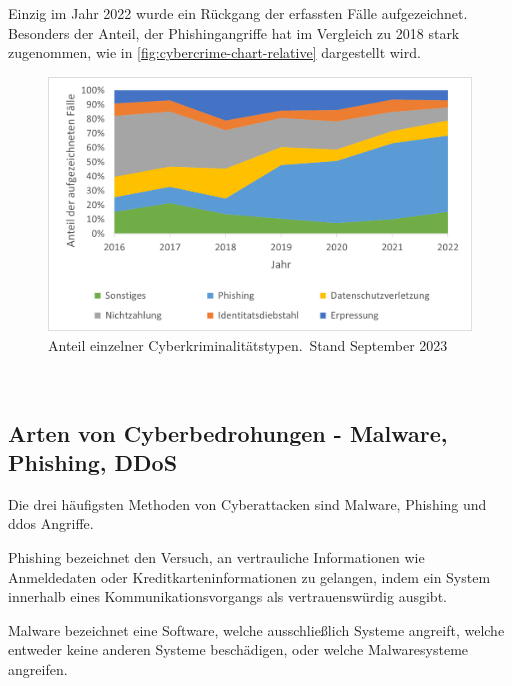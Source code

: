 Einzig im Jahr 2022 wurde ein Rückgang der erfassten Fälle aufgezeichnet.
Besonders der Anteil, der Phishingangriffe hat im Vergleich zu 2018 stark zugenommen, wie in \autoref{fig:cybercrime-chart-relative} dargestellt wird.

\begin{figure}[htpb]
    \centering
    \includegraphics[width = 0.65\linewidth]{src/abbildungen/Anteile_Cyberkriminalitaet}
    \captionsetup{width=\linewidth, format=hang}
    \caption[Anteil einzelner Cyberkriminalitätstypen]{Anteil einzelner Cyberkriminalitätstypen.\footnotemark{}\ Stand September 2023}
    \label{fig:cybercrime-chart-relative}
\end{figure}\ 

\subsection[Arten von Cyberbedrohungen]{Arten von Cyberbedrohungen - Malware, Phishing, DDoS}\label{subsec:arten-von-cyberbedrohungen---malware-phishing-ddos}

Die drei häufigsten Methoden von Cyberattacken sind Malware, Phishing und \ac{ddos} Angriffe.

\begin{definition}
    \label{def:phishing}
    Phishing bezeichnet den Versuch, an vertrauliche Informationen wie Anmeldedaten oder Kreditkarteninformationen zu gelangen, indem ein System innerhalb eines Kommunikationsvorgangs als vertrauenswürdig ausgibt.\autocite[\vglf][]{study-on-phishing-attacks:2018}
\end{definition}

\begin{definition}
    \label{def:malware}
    Malware bezeichnet eine Software, welche ausschließlich Systeme angreift, welche entweder keine anderen Systeme beschädigen, oder welche Malwaresysteme angreifen.\autocite[\vglf][\pagef 108f.]{definition-malware-2010}
\end{definition}

